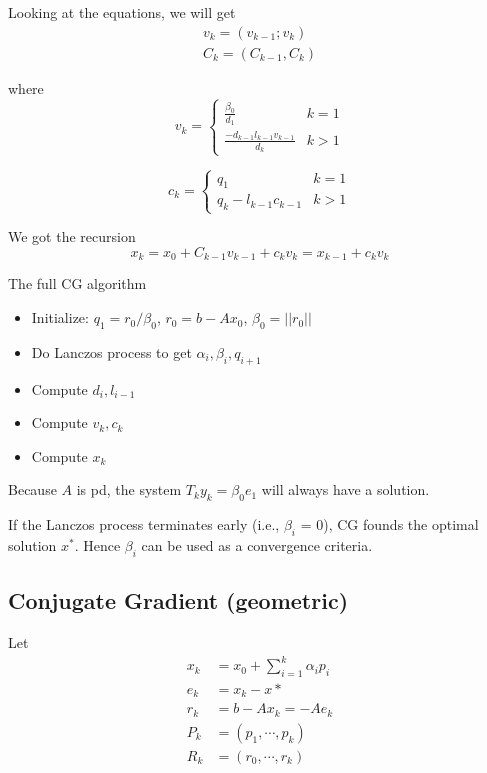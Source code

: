 \documentclass{article}
\newenvironment{remark}[1][Remark]{\begin{trivlist}
\item[\hskip \labelsep {\bfseries #1}]}{\end{trivlist}}
\begin{document}
Looking at the equations, we will get
\begin{align*}
v_k = (v_{k-1}; v_k)\\
C_k = (C_{k-1}, C_k)
\end{align*}

where
$$v_k = \begin{cases}
\frac{\beta_0}{d_1} & k=1 \\
\frac{-d_{k-1}l_{k-1}v_{k-1}}{d_k} & k>1
\end{cases}$$

$$c_k = \begin{cases}
q_1 & k=1\\
q_k - l_{k-1} c_{k-1} & k>1
\end{cases}$$

We got the recursion
$$x_k = x_0 + C_{k-1} v_{k-1} + c_k v_k = x_{k-1} + c_k v_k$$

The full CG algorithm
\begin{itemize}
\item Initialize: $q_1 = r_0 / \beta_0$, $r_0 = b - Ax_0$, $\beta_0 = ||r_0||$
\item Do Lanczos process to get $\alpha_i, \beta_i, q_{i+1}$
\item Compute $d_i, l_{i-1}$
\item Compute $v_k, c_k$
\item Compute $x_k$
\end{itemize}

\begin{remark}
Because $A$ is pd, the system $T_k y_k = \beta_0 e_1$ will always have a solution.
\end{remark}

\begin{remark}
If the Lanczos process terminates early (i.e., $\beta_i$ = 0), CG founds the optimal solution $x^*$. Hence $\beta_i$ can be used as a convergence criteria.
\end{remark}

\subsection{Conjugate Gradient (geometric)}
Let
\begin{align}
x_k &= x_0 + \sum_{i=1}^k \alpha_i p_i\label{eqn:cgg-x}\\
e_k &= x_k - x*\nonumber\\
r_k &= b - Ax_k = -Ae_k \label{eqn:cgg-r}\\
P_k &= (p_1, \cdots, p_k) \nonumber\\
R_k &= (r_0, \cdots, r_k) \nonumber
\end{align}
\end{document}
